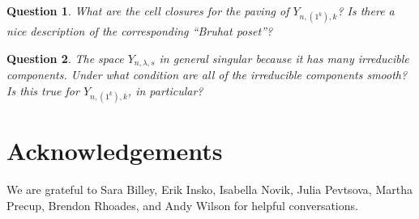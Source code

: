 \documentclass[12pt]{amsart}
\newcommand{\la}{\lambda}
\newtheorem{question}{Question}
\begin{document}

\begin{question}
What are the cell closures for the paving of $Y_{n,(1^k),k}$? Is there a nice description of the corresponding ``Bruhat poset''?
\end{question}


 
 
 \begin{question}
 The space $Y_{n,\la,s}$ in general singular because it has many irreducible components. Under what condition are all of the irreducible components smooth? Is this true for $Y_{n,(1^k),k}$, in particular?
\end{question}




\section{Acknowledgements}

We are grateful to Sara Billey, Erik Insko, Isabella Novik, Julia Pevtsova, Martha Precup, Brendon Rhoades, and Andy Wilson for helpful conversations.




\end{document}
